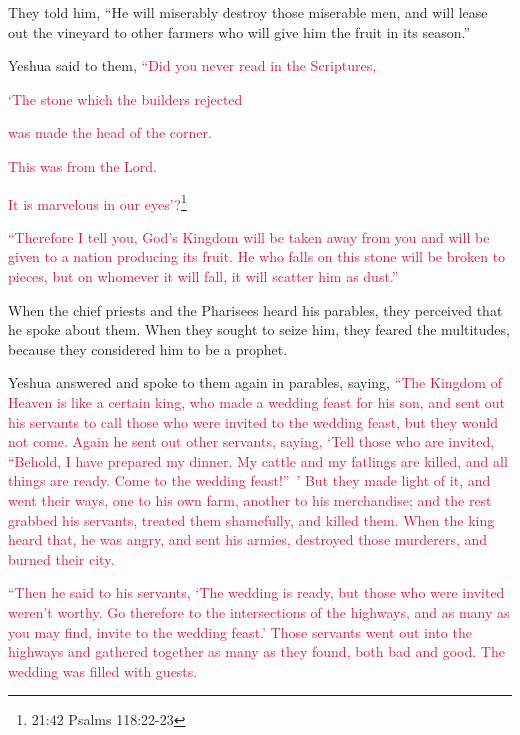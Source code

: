 \myverse{}They told him, “He will miserably destroy those miserable men,
and will lease out the vineyard to other farmers who will give him the fruit in its season.”

\myverse{}Yeshua said to them,
\textcolor{crimson}{“Did you never read in the Scriptures,
}

\textcolor{crimson}{‘The stone which the builders rejected}

\textcolor{crimson}{was made the head of the corner.}

\textcolor{crimson}{This was from the Lord.}

\textcolor{crimson}{It is marvelous in our eyes’?}\footnote{21:42 Psalms 118:22-23}

\myverse{}\textcolor{crimson}{“Therefore I tell you, God’s Kingdom will be taken away
	from you and will be given to a nation producing its fruit.
}
\myverse{}\textcolor{crimson}{He who falls on this stone will be broken to pieces, but on whomever
	it will fall, it will scatter him as dust.”}

\myverse{}When the chief priests and the Pharisees heard his parables,
they perceived that he spoke about them.
\myverse{}When they sought to seize him, they feared the multitudes, because they considered
him to be a prophet.


\mychapter{} \myverse*{}Yeshua answered and spoke to them again in parables, saying, \myverse{}\textcolor{crimson}{“The Kingdom of Heaven is like a certain king, who made a wedding feast for his son,} \myverse{}\textcolor{crimson}{and sent out his servants to call those who were invited to the wedding feast, but they would not come.} \myverse{}\textcolor{crimson}{Again he sent out other servants, saying, ‘Tell those who are invited, “Behold, I have prepared my dinner. My cattle and my fatlings are killed, and all things are ready. Come to the wedding feast!” ’}
\myverse{}\textcolor{crimson}{But they made light of it, and went their ways, one to his own farm, another to his merchandise;} \myverse{}\textcolor{crimson}{and the rest grabbed his servants, treated them shamefully, and killed them.} \myverse{}\textcolor{crimson}{When the king heard that, he was angry, and sent his armies, destroyed
	those murderers, and burned their city.}

\myverse{}\textcolor{crimson}{“Then he said to his servants, ‘The wedding is ready, but
	those who were invited weren’t worthy.
}
\myverse{}\textcolor{crimson}{Go therefore to the intersections of the highways, and as many as you may
	find, invite to the wedding feast.’
}
\myverse{}\textcolor{crimson}{Those servants went out into the highways and gathered together as many
	as they found, both bad and good. The wedding was filled with guests.
}

